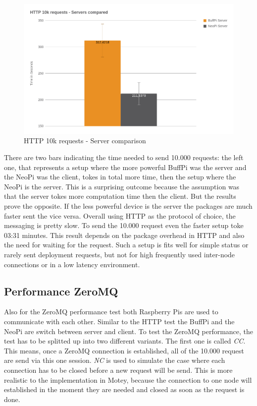 \begin{figure}[H]
    \centering
    \includegraphics[width=\textwidth]{resources/images/performance_http_server_comparison.png}
    \caption[HTTP 10k requests - Server comparison]{HTTP 10k requests - Server comparison}
    \label{fig:performance_http_server_comparison}
\end{figure}

There are two bars indicating the time needed to send 10.000 requests: the left one, that represents a setup where the more powerful BuffPi was the server and the NeoPi was the client, tokes in total more time, then the setup where the NeoPi is the server.
This is a surprising outcome because the assumption was that the server tokes more computation time then the client.
But the results prove the opposite.
If the less powerful device is the server the packages are much faster sent the vice versa.
Overall using \ac{HTTP} as the protocol of choice, the messaging is pretty slow.
To send the 10.000 request even the faster setup toke 03:31 minutes.
This result depends on the package overhead in \ac{HTTP} and also the need for waiting for the request.
Such a setup is fits well for simple status or rarely sent deployment requests, but not for high frequently used inter-node connections or in a low latency environment.

\subsection{Performance ZeroMQ}
Also for the ZeroMQ performance test both Raspberry Pis are used to communicate with each other.
Similar to the \ac{HTTP} test the BuffPi and the NeoPi are switch between server and client.
To test the ZeroMQ performance, the test has to be splitted up into two different variants.
The first one is called \textit{\ac{CC}}.
This means, once a ZeroMQ connection is established, all of the 10.000 request are send via this one session.
\textit{\ac{NC}} is used to simulate the case where each connection has to be closed before a new request will be send.
This is more realistic to the implementation in Motey, because the connection to one node will established in the moment they are needed and closed as soon as the request is done.\newline


